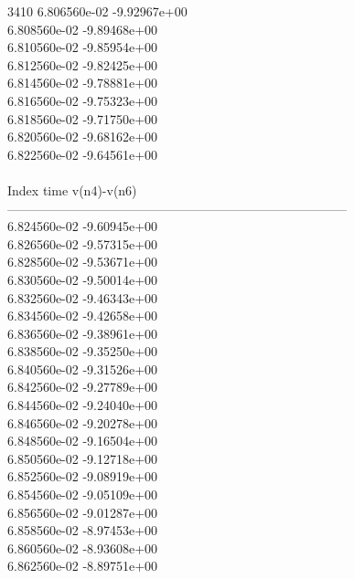 3410	6.806560e-02	-9.92967e+00	\\ 	6.808560e-02	-9.89468e+00	\\ 	6.810560e-02	-9.85954e+00	\\ 	6.812560e-02	-9.82425e+00	\\ 	6.814560e-02	-9.78881e+00	\\ 	6.816560e-02	-9.75323e+00	\\ 	6.818560e-02	-9.71750e+00	\\ 	6.820560e-02	-9.68162e+00	\\ 	6.822560e-02	-9.64561e+00	\\ \hline
\\ \hline
Index   time            v(n4)-v(n6)     \\ \hline
--------------------------------------------------------------------------------\\ 	6.824560e-02	-9.60945e+00	\\ 	6.826560e-02	-9.57315e+00	\\ 	6.828560e-02	-9.53671e+00	\\ 	6.830560e-02	-9.50014e+00	\\ 	6.832560e-02	-9.46343e+00	\\ 	6.834560e-02	-9.42658e+00	\\ 	6.836560e-02	-9.38961e+00	\\ 	6.838560e-02	-9.35250e+00	\\ 	6.840560e-02	-9.31526e+00	\\ 	6.842560e-02	-9.27789e+00	\\ 	6.844560e-02	-9.24040e+00	\\ 	6.846560e-02	-9.20278e+00	\\ 	6.848560e-02	-9.16504e+00	\\ 	6.850560e-02	-9.12718e+00	\\ 	6.852560e-02	-9.08919e+00	\\ 	6.854560e-02	-9.05109e+00	\\ 	6.856560e-02	-9.01287e+00	\\ 	6.858560e-02	-8.97453e+00	\\ 	6.860560e-02	-8.93608e+00	\\ 	6.862560e-02	-8.89751e+00	\\ \hline

